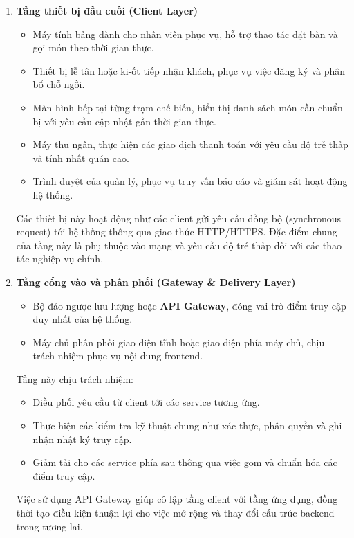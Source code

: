 \begin{enumerate}

  \item \textbf{Tầng thiết bị đầu cuối (Client Layer)}
  \begin{itemize}
    \item Máy tính bảng dành cho nhân viên phục vụ, hỗ trợ thao tác đặt bàn và gọi món theo thời gian thực.
    \item Thiết bị lễ tân hoặc ki-ốt tiếp nhận khách, phục vụ việc đăng ký và phân bổ chỗ ngồi.
    \item Màn hình bếp tại từng trạm chế biến, hiển thị danh sách món cần chuẩn bị với yêu cầu cập nhật gần thời gian thực.
    \item Máy thu ngân, thực hiện các giao dịch thanh toán với yêu cầu độ trễ thấp và tính nhất quán cao.
    \item Trình duyệt của quản lý, phục vụ truy vấn báo cáo và giám sát hoạt động hệ thống.
  \end{itemize}

  Các thiết bị này hoạt động như các client gửi yêu cầu đồng bộ (synchronous request) tới hệ thống thông qua giao thức HTTP/HTTPS. Đặc điểm chung của tầng này là phụ thuộc vào mạng và yêu cầu độ trễ thấp đối với các thao tác nghiệp vụ chính.

  \item \textbf{Tầng cổng vào và phân phối (Gateway \& Delivery Layer)}
  \begin{itemize}
    \item Bộ đảo ngược lưu lượng hoặc \textbf{API Gateway}, đóng vai trò điểm truy cập duy nhất của hệ thống.
    \item Máy chủ phân phối giao diện tĩnh hoặc giao diện phía máy chủ, chịu trách nhiệm phục vụ nội dung frontend.
  \end{itemize}

  Tầng này chịu trách nhiệm:
  \begin{itemize}
    \item Điều phối yêu cầu từ client tới các service tương ứng.
    \item Thực hiện các kiểm tra kỹ thuật chung như xác thực, phân quyền và ghi nhận nhật ký truy cập.
    \item Giảm tải cho các service phía sau thông qua việc gom và chuẩn hóa các điểm truy cập.
  \end{itemize}

  Việc sử dụng API Gateway giúp cô lập tầng client với tầng ứng dụng, đồng thời tạo điều kiện thuận lợi cho việc mở rộng và thay đổi cấu trúc backend trong tương lai.


\end{enumerate}
